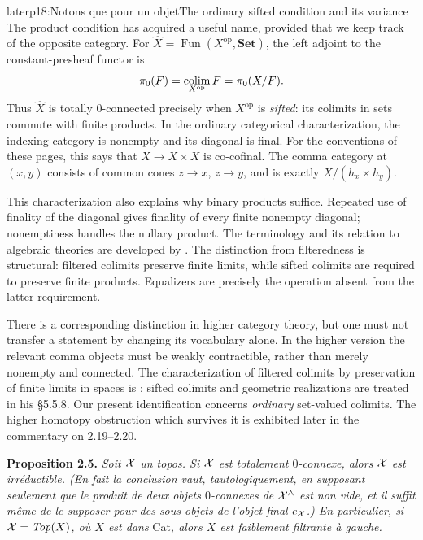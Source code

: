 \begin{dcomment}{later}{p18:Notons que pour un objet}{The ordinary sifted condition and its variance}
The product condition has acquired a useful name, provided that we keep track of the opposite category. For $\widehat X=\operatorname{Fun}(X^{\mathrm{op}},\mathbf {Set})$, the left adjoint to the constant-presheaf functor is
\[
 \pi _0(F)=\mathop{\rm colim}_{X^{\mathrm{op}}}F
          =\pi _0(X/F).
\]
Thus $\widehat X$ is totally $0$-connected precisely when $X^{\mathrm{op}}$ is \emph{sifted}: its colimits in sets commute with finite products. In the ordinary categorical characterization, the indexing category is nonempty and its diagonal is final. For the conventions of these pages, this says that $X\to X\times X$ is co-cofinal. The comma category at $(x,y)$ consists of common cones $z\to x$, $z\to y$, and is exactly $X/(h_x\times h_y)$.

This characterization also explains why binary products suffice. Repeated use of finality of the diagonal gives finality of every finite nonempty diagonal; nonemptiness handles the nullary product. The terminology and its relation to algebraic theories are developed by \citet{AdamekRosickyVitale2010}. The distinction from filteredness is structural: filtered colimits preserve finite limits, while sifted colimits are required to preserve finite products. Equalizers are precisely the operation absent from the latter requirement.

There is a corresponding distinction in higher category theory, but one must not transfer a statement by changing its vocabulary alone. In the higher version the relevant comma objects must be weakly contractible, rather than merely nonempty and connected. The characterization of filtered colimits by preservation of finite limits in spaces is \citet[Proposition 5.3.3.3]{Lurie2009HTT}; sifted colimits and geometric realizations are treated in his \S5.5.8. Our present identification concerns \emph{ordinary} set-valued colimits. The higher homotopy obstruction which survives it is exhibited later in the commentary on 2.19--2.20.
\end{dcomment}


\noindent\textbf{Proposition 2.5.} \textit{Soit $\mathcal{X}$ un topos. Si $\mathcal{X}$ est totalement $0$-connexe, alors $\mathcal{X}$ est irréductible. (En fait la conclusion vaut, tautologiquement, en supposant seulement que le produit de deux objets $0$-connexes de $\mathcal{X}^{\wedge}$ est non vide, et il suffit même de le supposer pour des sous-objets de l'objet final $e_{\mathcal{X}}$.) En particulier, si $\mathcal{X} = \mathit{Top}(X)$, où $X$ est dans} Cat\textit{, alors $X$ est faiblement filtrante à gauche.}

